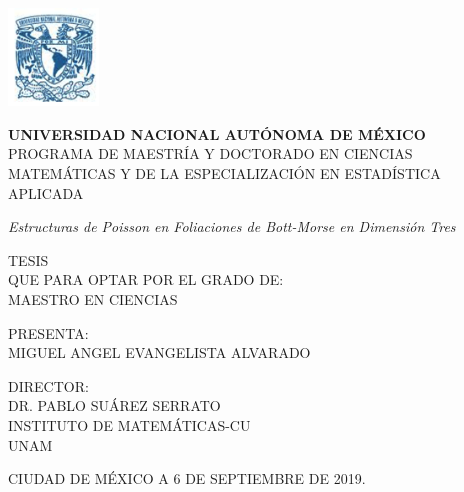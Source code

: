 \documentclass[a4paper,10pt]{book}
\begin{document}
\begin{titlepage}
\thispagestyle{empty}
\begin{center}
    \includegraphics[height=2.6cm]{unam_oficial.png}
\end{center}
\begin{center}
    \textbf{\small UNIVERSIDAD NACIONAL AUT\'ONOMA DE M\'EXICO}\\
    {\footnotesize PROGRAMA DE MAESTR\'IA Y DOCTORADO EN CIENCIAS MATEM\'ATICAS Y DE LA ESPECIALIZACI\'ON EN ESTAD\'ISTICA APLICADA}
\end{center}
\vspace{1cm}
\begin{center}
    \textit{\small Estructuras de Poisson en Foliaciones de Bott-Morse en Dimensi\'on Tres}
\end{center}
\vspace{1cm}
\begin{center}
    {\footnotesize TESIS\\ 
    QUE PARA OPTAR POR EL GRADO DE: \\
    MAESTRO EN CIENCIAS} 
\end{center}
\vspace{1cm}
\begin{center}
    {\footnotesize PRESENTA:\\
    MIGUEL ANGEL EVANGELISTA ALVARADO}
\end{center}
\vspace{1cm}
\begin{center}
    {\footnotesize DIRECTOR:\\
    DR. PABLO SU\'AREZ SERRATO\\
    INSTITUTO DE MATEM\'ATICAS-CU\\
    UNAM}
\end{center}
\vspace{1cm}
\begin{center}
    {\footnotesize CIUDAD DE M\'EXICO A 6 DE SEPTIEMBRE DE 2019.}     
\end{center}


\end{titlepage}
\end{document}
